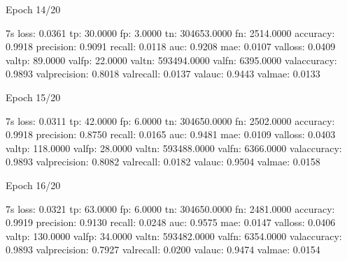 \documentclass[letterpaper,10pt,english]{sphinxmanual}
\begin{document}
\begin{sphinxVerbatim}[commandchars=\\\{\}]
Epoch 14/20
\end{sphinxVerbatim}

\begin{sphinxVerbatim}[commandchars=\\\{\}]
 \PYGZhy{} 7s \PYGZhy{} loss: 0.0361 \PYGZhy{} tp: 30.0000 \PYGZhy{} fp: 3.0000 \PYGZhy{} tn: 304653.0000 \PYGZhy{} fn: 2514.0000 \PYGZhy{} accuracy: 0.9918 \PYGZhy{} precision: 0.9091 \PYGZhy{} recall: 0.0118 \PYGZhy{} auc: 0.9208 \PYGZhy{} mae: 0.0107 \PYGZhy{} val\PYGZus{}loss: 0.0409 \PYGZhy{} val\PYGZus{}tp: 89.0000 \PYGZhy{} val\PYGZus{}fp: 22.0000 \PYGZhy{} val\PYGZus{}tn: 593494.0000 \PYGZhy{} val\PYGZus{}fn: 6395.0000 \PYGZhy{} val\PYGZus{}accuracy: 0.9893 \PYGZhy{} val\PYGZus{}precision: 0.8018 \PYGZhy{} val\PYGZus{}recall: 0.0137 \PYGZhy{} val\PYGZus{}auc: 0.9443 \PYGZhy{} val\PYGZus{}mae: 0.0133
\end{sphinxVerbatim}

\begin{sphinxVerbatim}[commandchars=\\\{\}]
Epoch 15/20
\end{sphinxVerbatim}

\begin{sphinxVerbatim}[commandchars=\\\{\}]
 \PYGZhy{} 7s \PYGZhy{} loss: 0.0311 \PYGZhy{} tp: 42.0000 \PYGZhy{} fp: 6.0000 \PYGZhy{} tn: 304650.0000 \PYGZhy{} fn: 2502.0000 \PYGZhy{} accuracy: 0.9918 \PYGZhy{} precision: 0.8750 \PYGZhy{} recall: 0.0165 \PYGZhy{} auc: 0.9481 \PYGZhy{} mae: 0.0109 \PYGZhy{} val\PYGZus{}loss: 0.0403 \PYGZhy{} val\PYGZus{}tp: 118.0000 \PYGZhy{} val\PYGZus{}fp: 28.0000 \PYGZhy{} val\PYGZus{}tn: 593488.0000 \PYGZhy{} val\PYGZus{}fn: 6366.0000 \PYGZhy{} val\PYGZus{}accuracy: 0.9893 \PYGZhy{} val\PYGZus{}precision: 0.8082 \PYGZhy{} val\PYGZus{}recall: 0.0182 \PYGZhy{} val\PYGZus{}auc: 0.9504 \PYGZhy{} val\PYGZus{}mae: 0.0158
\end{sphinxVerbatim}

\begin{sphinxVerbatim}[commandchars=\\\{\}]
Epoch 16/20
\end{sphinxVerbatim}

\begin{sphinxVerbatim}[commandchars=\\\{\}]
 \PYGZhy{} 7s \PYGZhy{} loss: 0.0321 \PYGZhy{} tp: 63.0000 \PYGZhy{} fp: 6.0000 \PYGZhy{} tn: 304650.0000 \PYGZhy{} fn: 2481.0000 \PYGZhy{} accuracy: 0.9919 \PYGZhy{} precision: 0.9130 \PYGZhy{} recall: 0.0248 \PYGZhy{} auc: 0.9575 \PYGZhy{} mae: 0.0147 \PYGZhy{} val\PYGZus{}loss: 0.0406 \PYGZhy{} val\PYGZus{}tp: 130.0000 \PYGZhy{} val\PYGZus{}fp: 34.0000 \PYGZhy{} val\PYGZus{}tn: 593482.0000 \PYGZhy{} val\PYGZus{}fn: 6354.0000 \PYGZhy{} val\PYGZus{}accuracy: 0.9893 \PYGZhy{} val\PYGZus{}precision: 0.7927 \PYGZhy{} val\PYGZus{}recall: 0.0200 \PYGZhy{} val\PYGZus{}auc: 0.9474 \PYGZhy{} val\PYGZus{}mae: 0.0154
\end{sphinxVerbatim}
\end{document}
